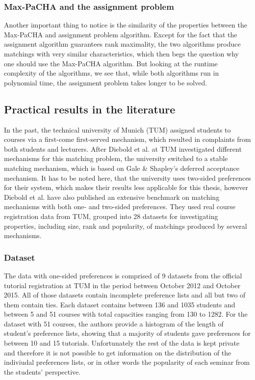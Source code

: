 \subsubsection{Max-PaCHA and the assignment problem}
Another important thing to notice is the similarity of the properties between the Max-PaCHA and assignment problem algorithm. Except for the fact that the assignment algorithm guarantees rank maximality, the two algorithms produce matchings with very similar characteristics, which then begs the question why one should use the Max-PaCHA algorithm. But looking at the runtime complexity of the algorithms, we see that, while both algorithms run in polynomial time, the assignment problem takes longer to be solved.

\subsection{Practical results in the literature}\label{sec:practical-results-lit}
In the past, the technical university of Munich (TUM) assigned students to courses via a first-come first-served mechanism, which resulted in complaints from both students and lecturers.\cite{tum-matching} After Diebold et al. \cite{Diebold2014} at TUM investigated different mechanisms for this matching problem, the university switched to a stable matching mechanism, which is based on Gale \& Shapley's deferred acceptance mechanism. It has to be noted here, that the university uses two-sided preferences for their system, which makes their results less applicable for this thesis, however Diebold et al. have also published an extensive benchmark on matching mechanisms with both one- and two-sided preferences.\cite{DieboldBenchmark} They used real course registration data from TUM, grouped into 28 datasets for investigating properties, including size, rank and popularity, of matchings produced by several mechanisms. 

\subsubsection{Dataset}
The data with one-sided preferences is comprised of 9 datasets from the official tutorial registration at TUM in the period between October 2012 and October 2015. All of those datasets contain incomplete preference lists and all but two of them contain ties. Each dataset contains between 136 and 1035 students and between 5 and 51 courses with total capacities ranging from 130 to 1282. For the dataset with 51 courses, the authors provide a histogram of the length of student's preference lists, showing that a majority of students gave preferences for between 10 and 15 tutorials.\cite{DieboldBenchmark} Unfortunately the rest of the data is kept private and therefore it is not possible to get information on the distribution of the indiviudal preferences lists, or in other words the popularity of each seminar from the students' perspective.

